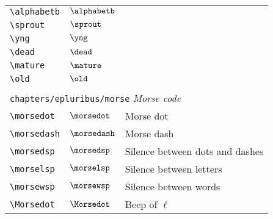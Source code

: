 \begin{longtable}{lll}
  {\color[rgb]{0.5,0.5,0.5}\texttt{\textbackslash alphabetb}}                                               & $\alphabetb$               & \\
  {\color[rgb]{0.5,0.5,0.5}\texttt{\textbackslash sprout}}                                                  & $\sprout$                  & \\
  {\color[rgb]{0.5,0.5,0.5}\texttt{\textbackslash yng}}                                                     & $\yng$                     & \\
  {\color[rgb]{0.5,0.5,0.5}\texttt{\textbackslash dead}}                                                    & $\dead$                    & \\
  {\color[rgb]{0.5,0.5,0.5}\texttt{\textbackslash mature}}                                                  & $\mature$                  & \\
  {\color[rgb]{0.5,0.5,0.5}\texttt{\textbackslash old}}                                                     & $\old$                     &                                                         \\
  &                            &                                                         \\
  \multicolumn{3}{l}{{\color[rgb]{0.5,0.5,0.5}\texttt{chapters/epluribus/morse}} \emph{Morse code}}
  \\
  \hline
  {\color[rgb]{0.5,0.5,0.5}\texttt{\textbackslash morsedot}}                                                & $\morsedot$                & Morse dot\\
  {\color[rgb]{0.5,0.5,0.5}\texttt{\textbackslash morsedash}}                                               & $\morsedash$               & Morse dash\\
  {\color[rgb]{0.5,0.5,0.5}\texttt{\textbackslash morsedsp}}                                                & $\morsedsp$                & Silence between dots and dashes\\
  {\color[rgb]{0.5,0.5,0.5}\texttt{\textbackslash morselsp}}                                                & $\morselsp$                & Silence between letters\\
  {\color[rgb]{0.5,0.5,0.5}\texttt{\textbackslash morsewsp}}                                                & $\morsewsp$                & Silence between words\\
  {\color[rgb]{0.5,0.5,0.5}\texttt{\textbackslash Morsedot}}                                                & $\Morsedot$                & Beep of $\ell$\\

\end{longtable}
